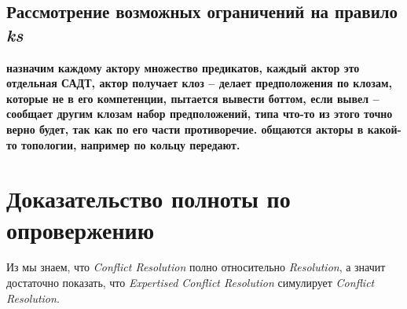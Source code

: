 \subsection{Рассмотрение возможных ограничений на правило \emph{ks}}
\label{sec:restr}






\textbf{назначим каждому актору множество предикатов, каждый актор это отдельная САДТ, актор получает клоз -- делает предположения по клозам, которые не в его компетенции, пытается вывести боттом, если вывел -- сообщает другим клозам набор предположений, типа что-то из этого точно верно будет, так как по его части противоречие. общаются акторы в какой-то топологии, например по кольцу передают.}


\section{Доказательство полноты по опровержению}

Из \cite{DBLP:journals/corr/SlaneyP16} мы знаем, что \emph{Conflict Resolution} полно относительно \emph{Resolution}, а значит достаточно показать, что \emph{Expertised Conflict Resolution} симулирует \emph{Conflict Resolution}.


